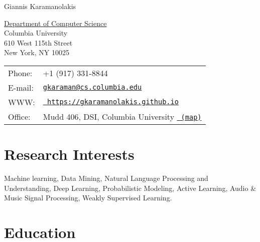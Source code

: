 \documentclass[letterpaper]{article}
\def\name{Giannis Karamanolakis}
\renewenvironment{itemize}{
  \begin{list}{}{
    \setlength{\leftmargin}{1.5em}
  }
}{
  \end{list}
}
\begin{document}



{\huge \name}


\vspace{0.25in}

\begin{minipage}{0.45\linewidth}
  \href{http://www.cs.columbia.edu/}{Department of Computer Science} \\
  Columbia University \\
  610 West 115th Street\\
  New York, NY 10025
\end{minipage}
\begin{minipage}{0.45\linewidth}
  \begin{tabular}{ll}
    Phone: & +1 (917) 331-8844 \\
    E-mail: & \href{mailto:gkaraman@cs.columbia.edu}{\tt gkaraman@cs.columbia.edu} \\
    WWW: & \href{https://gkaramanolakis.github.io}{\tt
    https://gkaramanolakis.github.io} \\
    Office: & Mudd 406, DSI, Columbia University \href{https://goo.gl/maps/CsUb6tbN69L2}{\tt
    (map)}
  \end{tabular}
\end{minipage}


\section*{Research Interests}

\begin{itemize}
  \item Machine learning, Data Mining, Natural Language Processing and Understanding, Deep Learning, Probabilistic Modeling, Active Learning, Audio \& Music Signal Processing, Weakly Supervised Learning.
\end{itemize}

\section*{Education}
\end{document}
